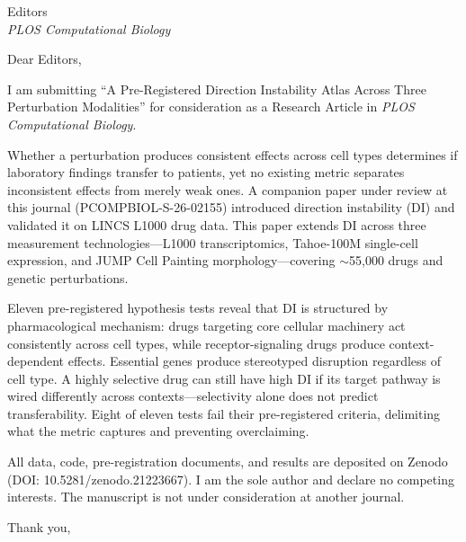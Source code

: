\documentclass[11pt]{letter}
\date{July 10, 2026}
\begin{document}
\begin{letter}{Editors \\ \textit{PLOS Computational Biology}}

\opening{Dear Editors,}

I am submitting ``A Pre-Registered Direction Instability Atlas Across Three Perturbation Modalities'' for consideration as a Research Article in \textit{PLOS Computational Biology}.

Whether a perturbation produces consistent effects across cell types determines if laboratory findings transfer to patients, yet no existing metric separates inconsistent effects from merely weak ones. A companion paper under review at this journal (PCOMPBIOL-S-26-02155) introduced direction instability (DI) and validated it on LINCS L1000 drug data. This paper extends DI across three measurement technologies---L1000 transcriptomics, Tahoe-100M single-cell expression, and JUMP Cell Painting morphology---covering ${\sim}$55,000 drugs and genetic perturbations.

Eleven pre-registered hypothesis tests reveal that DI is structured by pharmacological mechanism: drugs targeting core cellular machinery act consistently across cell types, while receptor-signaling drugs produce context-dependent effects. Essential genes produce stereotyped disruption regardless of cell type. A highly selective drug can still have high DI if its target pathway is wired differently across contexts---selectivity alone does not predict transferability. Eight of eleven tests fail their pre-registered criteria, delimiting what the metric captures and preventing overclaiming.

All data, code, pre-registration documents, and results are deposited on Zenodo (DOI: 10.5281/zenodo.21223667). I am the sole author and declare no competing interests. The manuscript is not under consideration at another journal.

\closing{Thank you,}

\end{letter}
\end{document}
